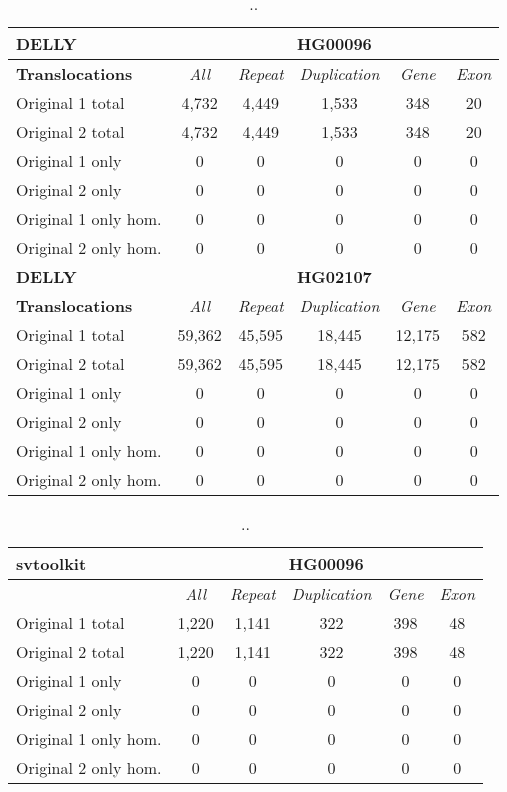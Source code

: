 \begin{table}[htb]
\caption{ .. }
\begin{center}
\begin{tabular}{|l|c||c|c|c|c|}
\hline
{\bf DELLY} & \multicolumn{5}{|c|}{\bf HG00096} \\
\hline
\cline{2-6}
{\bf Translocations} & {\it All} & {\it Repeat} & {\it Duplication} & {\it Gene} & {\it Exon} \\
\hline
Original 1 total & 4,732 & 4,449 & 1,533 & 348 & 20\\ 
\hline
Original 2 total & 4,732 & 4,449 & 1,533 & 348 & 20\\ 
\hline
Original 1 only & 0 & 0 & 0 & 0 & 0\\ 
\hline
Original 2 only & 0 & 0 & 0 & 0 & 0\\ 
\hline
Original 1 only hom. & 0 & 0 & 0 & 0 & 0\\ 
\hline
Original 2 only hom. & 0 & 0 & 0 & 0 & 0\\ 
\hline
\hline
{\bf DELLY} & \multicolumn{5}{|c|}{\bf HG02107} \\
\hline
\cline{2-6}
{\bf Translocations} & {\it All} & {\it Repeat} & {\it Duplication} & {\it Gene} & {\it Exon} \\
\hline
Original 1 total & 59,362 & 45,595 & 18,445 & 12,175 & 582 \\
\hline
Original 2 total & 59,362 & 45,595 & 18,445 & 12,175 & 582 \\
\hline
Original 1 only & 0 & 0 & 0 & 0 & 0\\ 
\hline
Original 2 only & 0 & 0 & 0 & 0 & 0\\ 
\hline
Original 1 only hom. & 0 & 0 & 0 & 0 & 0\\ 
\hline
Original 2 only hom. & 0 & 0 & 0 & 0 & 0\\ 
\hline
\end{tabular}
\end{center}
\label{tab:orig-vs-orig2-delly-trans}
\end{table}

\begin{table}[htb]
\caption{ .. }
\begin{center}
\begin{tabular}{|l|c||c|c|c|c|}
\hline
{\bf svtoolkit} & \multicolumn{5}{|c|}{\bf HG00096} \\
\hline
\cline{2-6}
{\bf} & {\it All} & {\it Repeat} & {\it Duplication} & {\it Gene} & {\it Exon} \\
\hline
Original 1 total & 1,220 & 1,141 & 322 & 398 & 48 \\
\hline
Original 2 total & 1,220 & 1,141 & 322 & 398 & 48 \\
\hline
Original 1 only & 0 & 0 & 0 & 0 & 0\\ 
\hline
Original 2 only & 0 & 0 & 0 & 0 & 0\\
\hline
Original 1 only hom. & 0 & 0 & 0 & 0 & 0\\ 
\hline
Original 2 only hom. & 0 & 0 & 0 & 0 & 0\\  
\hline
\hline
\end{tabular}
\end{center}
\label{tab:orig-vs-orig2-svtoolkit}
\end{table}
